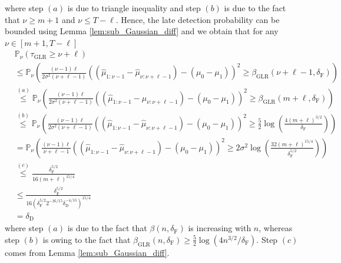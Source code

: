 \documentclass[12pt]{interact}
\newcommand{\lp}{\left(}
\newcommand{\rp}{\right)}
\newcommand{\lb}{\left[}
\newcommand{\rb}{\right]}
\newcommand{\lba}{\left\lvert}
\newcommand{\rba}{\right\rvert}
\newcommand{\mrm}{\mathrm}
\renewcommand{\Pr}{\mathbb{P}}
\theoremstyle{plain}
\begin{document}
%
where step $(a)$ is due to triangle inequality and step $(b)$ is due to the fact that $\nu\geq m+1$ and $\nu\leq T-\ell$. Hence, the late detection probability can be bounded using Lemma \ref{lem:sub_Gaussian_diff} and we obtain that for any $\nu\in\lb m+1,T-\ell\rb$
%
\begin{equation}
\begin{aligned}
    &\Pr_{\nu}\lp\tau_{\mrm{GLR}}\geq\nu+\ell\rp\\
    &\leq\Pr_{\nu}\lp\frac{\lp\nu-1\rp \ell}{2\sigma^{2}\lp\nu+\ell-1\rp}\lp\lp\hat{\mu}_{1:\nu-1}-\hat{\mu}_{\nu:\nu+\ell-1}\rp-\lp\mu_{0}-\mu_{1}\rp\rp^{2}\geq\beta_{\mrm{GLR}}\lp\nu+\ell-1,\delta_{\mrm{F}}\rp\rp\\
    &\overset{(a)}{\leq}\Pr_{\nu}\lp\frac{\lp\nu-1\rp \ell}{2\sigma^{2}\lp\nu+\ell-1\rp}\lp\lp\hat{\mu}_{1:\nu-1}-\hat{\mu}_{\nu:\nu+\ell-1}\rp-\lp\mu_{0}-\mu_{1}\rp\rp^{2}\geq\beta_{\mrm{GLR}}\lp m+\ell,\delta_{\mrm{F}}\rp\rp\\
    &\overset{(b)}{\leq}\Pr_{\nu}\lp\frac{\lp\nu-1\rp \ell}{2\sigma^{2}\lp\nu+\ell-1\rp}\lp\lp\hat{\mu}_{1:\nu-1}-\hat{\mu}_{\nu:\nu+\ell-1}\rp-\lp\mu_{0}-\mu_{1}\rp\rp^{2}\geq\frac{5}{2}\log\lp\frac{4\lp m+\ell\rp^{3/2}}{\delta_{\mrm{F}}}\rp\rp\\
    &=\Pr_{\nu}\lp\frac{\lp\nu-1\rp \ell}{\nu+\ell-1}\lp\lp\hat{\mu}_{1:\nu-1}-\hat{\mu}_{\nu:\nu+\ell-1}\rp-\lp\mu_{0}-\mu_{1}\rp\rp^{2}\geq2\sigma^{2}\log\lp\frac{32\lp m+\ell \rp^{15/4}}{\delta_{\mrm{F}}^{5/2}}\rp\rp\\
    &\overset{(c)}{\leq}\frac{\delta_{\mrm{F}}^{5/2}}{16\lp m+\ell\rp^{15/4}}\\
    &\leq\frac{\delta_{\mrm{F}}^{5/2}}{16\lp\delta_{\mrm{F}}^{5/2}2^{-16/15}\delta^{-4/15}_{\mrm{D}}\rp^{15/4}}\\
    &=\delta_{\mrm{D}}
\end{aligned}
\end{equation}
%
where step $(a)$ is due to the fact that $\beta\lp n,\delta_{\mrm{F}}\rp$ is increasing with $n$, whereas step $(b)$ is owing to the fact that $\beta_{\mrm{GLR}} \lp n,\delta_{\mrm{F}}\rp\geq\frac{5}{2}\log\lp4n^{3/2}/\delta_{\mrm{F}}\rp$. Step $(c)$ comes from Lemma \ref{lem:sub_Gaussian_diff}.
\end{document}
